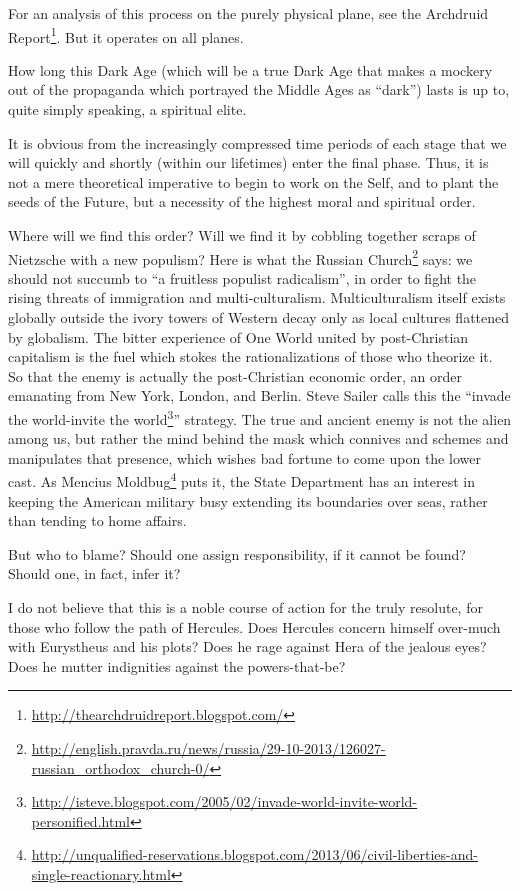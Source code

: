 For an analysis of this process on the purely physical plane, see the Archdruid Report\footnote{\url{http://thearchdruidreport.blogspot.com/}}. But it operates on all planes.

How long this Dark Age (which will be a true Dark Age that makes a mockery out of the propaganda which portrayed the Middle Ages as ``dark'') lasts is up to, quite simply speaking, a spiritual elite.

It is obvious from the increasingly compressed time periods of each stage that we will quickly and shortly (within our lifetimes) enter the final phase. Thus, it is not a mere theoretical imperative to begin to work on the Self, and to plant the seeds of the Future, but a necessity of the highest moral and spiritual order.

Where will we find this order? Will we find it by cobbling together scraps of Nietzsche with a new populism? Here is what the Russian Church\footnote{\url{http://english.pravda.ru/news/russia/29-10-2013/126027-russian\_orthodox\_church-0/}} says: we should not succumb to ``a fruitless populist radicalism'', in order to fight the rising threats of immigration and multi-culturalism. Multiculturalism itself exists globally outside the ivory towers of Western decay only as local cultures flattened by globalism. The bitter experience of One World united by post-Christian capitalism is the fuel which stokes the rationalizations of those who theorize it. So that the enemy is actually the post-Christian economic order, an order emanating from New York, London, and Berlin. Steve Sailer calls this the ``invade the world-invite the world\footnote{\url{http://isteve.blogspot.com/2005/02/invade-world-invite-world-personified.html}}'' strategy. The true and ancient enemy is not the alien among us, but rather the mind behind the mask which connives and schemes and manipulates that presence, which wishes bad fortune to come upon the lower cast. As Mencius Moldbug\footnote{\url{http://unqualified-reservations.blogspot.com/2013/06/civil-liberties-and-single-reactionary.html}} puts it, the State Department has an interest in keeping the American military busy extending its boundaries over seas, rather than tending to home affairs.

But who to blame? Should one assign responsibility, if it cannot be found? Should one, in fact, infer it?

I do not believe that this is a noble course of action for the truly resolute, for those who follow the path of Hercules. Does Hercules concern himself over-much with Eurystheus and his plots? Does he rage against Hera of the jealous eyes? Does he mutter indignities against the powers-that-be?

